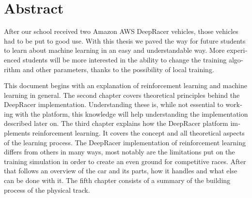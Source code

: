 \chapter{Abstract}

\begin{english} %
After our school received two Amazon AWS DeepRacer vehicles, those vehicles had to be put to good use. With this thesis we paved the way for future students to learn about machine learning in an easy and understandable way. More experienced students will be more interested in the ability to change the training algorithm and other parameters, thanks to the possibility of local training. 

This document begins with an explanation of reinforcement learning and machine learning in general. The second chapter covers theoretical principles behind the DeepRacer implementation. Understanding these is, while not essential to working with the platform, this knowledge will help understanding the implementation described later on. The third chapter explains how the DeepRacer platform implements reinforcement learning. It covers the concept and all theoretical aspects of the learning process. The DeepRacer implementation of reinforcement learning differs from others in many ways, most notably are the limitations put on the training simulation in order to create an even ground for competitive races. After that follows an overview of the car and its parts, how it handles and what else can be done with it. The fifth chapter consists of a summary of the building process of the physical track.

\end{english}
